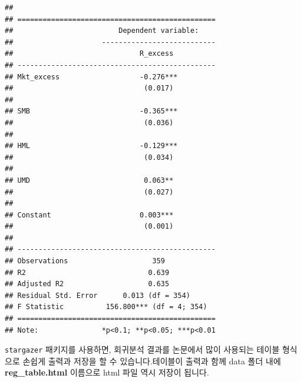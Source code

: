 \documentclass[12pt,]{book}
\begin{document}
\begin{verbatim}
## 
## ===============================================
##                         Dependent variable:    
##                     ---------------------------
##                              R_excess          
## -----------------------------------------------
## Mkt_excess                   -0.276***         
##                               (0.017)          
##                                                
## SMB                          -0.365***         
##                               (0.036)          
##                                                
## HML                          -0.129***         
##                               (0.034)          
##                                                
## UMD                           0.063**          
##                               (0.027)          
##                                                
## Constant                     0.003***          
##                               (0.001)          
##                                                
## -----------------------------------------------
## Observations                    359            
## R2                             0.639           
## Adjusted R2                    0.635           
## Residual Std. Error      0.013 (df = 354)      
## F Statistic          156.800*** (df = 4; 354)  
## ===============================================
## Note:               *p<0.1; **p<0.05; ***p<0.01
\end{verbatim}

\texttt{stargazer} 패키지를 사용하면, 회귀분석 결과를 논문에서 많이 사용되는 테이블 형식으로 손쉽게 출력과 저장을 할 수 있습니다.테이블이 출력과 함께 data 폴더 내에 \textbf{reg\_table.html} 이름으로 html 파일 역시 저장이 됩니다.


\end{document}
